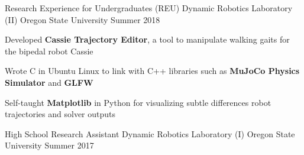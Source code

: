 \begin{cventries}
  \cventry
    {Research Experience for Undergraduates (REU)} %
    {Dynamic Robotics Laboratory (II)} %
    {Oregon State University} %
    {Summer 2018} %
    {
      \begin{cvitems} %
        \item {Developed \textbf{Cassie Trajectory Editor}, a tool to manipulate walking gaits for the bipedal robot Cassie}
        \item {Wrote C in Ubuntu Linux to link with C++ libraries such as \textbf{MuJoCo Physics Simulator} and \textbf{GLFW}}
        \item {Self-taught \textbf{Matplotlib} in Python for visualizing subtle differences robot trajectories and solver outputs}
      \end{cvitems}
    }
  



  \cventry
    {High School Research Assistant} %
    {Dynamic Robotics Laboratory (I)} %
    {Oregon State University} %
    {Summer 2017} %
    {
      \begin{cvitems} %
      \end{cvitems}
    }





\end{cventries}
